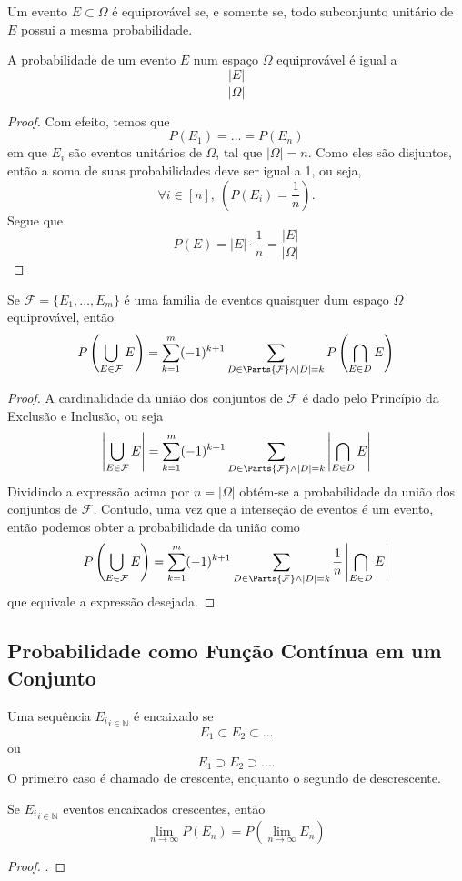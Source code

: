 \begin{def:evento equiprovavel}
Um evento $E \subset \Omega$ é equiprovável se, e somente se, todo subconjunto unitário de
$E$ possui a mesma probabilidade.
\end{def:evento equiprovavel}

\begin{prop:equiprovavel}
A probabilidade de um evento $E$ num espaço $\Omega$ equiprovável
é igual a
\[
	\frac{|E|}{|\Omega|}
\]
\begin{proof}
	Com efeito, temos que
	\[
		P(E_1) = \ldots = P(E_n)
	\]
	em que $E_i$ são eventos unitários de $\Omega$, tal que $|\Omega| = n$. Como eles são
	disjuntos, então a soma de suas probabilidades deve ser igual a 1, ou seja,
	\[
		\forall i \in [n],\ \left(P(E_i) = \frac{1}{n}\right).
	\]
	Segue que
	\[
		P(E) = |E| \cdot \frac{1}{n} = \frac{|E|}{|\Omega|}
	\]
\end{proof}
\end{prop:equiprovavel}

\begin{cor:pie}
Se $\mathcal{F} = \{E_1, \ldots, E_m\}$ é uma família de eventos quaisquer dum espaço
$\Omega$ equiprovável, então
\[
	P\left(\bigcup_{E \in \mathcal{F}}E\right) = \sum_{k=1}^m (-1)^{k+1}
	\sum_{D \in \Parts{\mathcal{F}}\land |D| = k} P\left(\bigcap_{E \in D} E\right)
\]
\begin{proof}
	A cardinalidade da união dos conjuntos de $\mathcal{F}$ é dado pelo Princípio da
	Exclusão e Inclusão, ou seja
	\[
		\left|\bigcup_{E \in \mathcal{F}}E\right| = \sum_{k=1}^m (-1)^{k+1}
		\sum_{D \in \Parts{\mathcal{F}} \land |D| = k} \left|\bigcap_{E \in D} E\right|
	\]
	Dividindo a expressão acima por $n = |\Omega|$ obtém-se a probabilidade da união dos
	conjuntos de $\mathcal{F}$. Contudo, uma vez que a interseção de eventos é um evento,
	então podemos obter a probabilidade da união como
	\[
		P\left(\bigcup_{E \in \mathcal{F}}E\right) = \sum_{k=1}^m (-1)^{k+1}
		\sum_{D \in \Parts{\mathcal{F}}\land |D| = k} \frac{1}{n}\left|\bigcap_{E \in D} E\right|
	\]
	que equivale a expressão desejada.
\end{proof}
\end{cor:pie}

\subsection{Probabilidade como Função Contínua em um Conjunto}

\begin{def:eventos encaixados}
Uma sequência ${E_i}_{i \in \mathbb{N}}$ é encaixado se
\[
	E_1 \subset E_2 \subset \ldots
\]
ou
\[
	E_1 \supset E_2 \supset \ldots.
\]
O primeiro caso é chamado de crescente, enquanto o segundo de descrescente.
\end{def:eventos encaixados}

\begin{prop:eventos encaixados}
Se ${E_i}_{i \in \mathbb{N}}$ eventos encaixados crescentes, então
\[
	\lim_{n \to \infty} P(E_n) = P\left(\lim_{n \to \infty} E_n\right)
\]
\begin{proof}
	.
\end{proof}
\end{prop:eventos encaixados}
